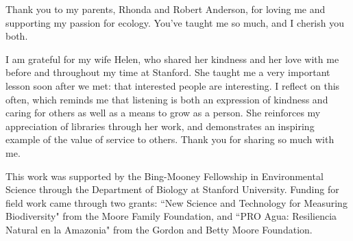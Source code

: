 Thank you to my parents, Rhonda and Robert Anderson, for loving me and supporting my passion for ecology. You've taught me so much, and I cherish you both.

I am grateful for my wife Helen, who shared her kindness and her love with me before and throughout my time at Stanford. She taught me a very important lesson soon after we met: that interested people are interesting. I reflect on this often, which reminds me that listening is both an expression of kindness and caring for others as well as a means to grow as a person. She reinforces my appreciation of libraries through her work, and demonstrates an inspiring example of the value of service to others. Thank you for sharing so much with me.

This work was supported by the Bing-Mooney Fellowship in Environmental Science through the Department of Biology at Stanford University. Funding for field work came through two grants: ``New Science and Technology for Measuring Biodiversity" from the Moore Family Foundation, and ``PRO Agua: Resiliencia Natural en la Amazonia" from the Gordon and Betty Moore Foundation.